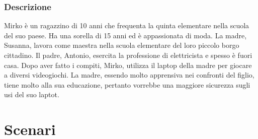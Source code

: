 \documentclass[../Report.tex]{subfiles}
\begin{document}
    \subsubsection{Descrizione}
    Mirko è un ragazzino di 10 anni che frequenta la quinta elementare nella scuola del suo paese. Ha una sorella di 15 anni ed è appassionata di moda. La madre, Susanna, lavora come maestra nella scuola elementare del loro piccolo borgo cittadino. Il padre, Antonio, esercita la professione di elettricista e spesso è fuori casa. Dopo aver fatto i compiti, Mirko, utilizza il laptop della madre per giocare a diversi videogiochi. La madre, essendo molto apprensiva nei confronti del figlio, tiene molto alla sua educazione, pertanto vorrebbe una maggiore sicurezza sugli usi del suo laptot.


    \section{Scenari}
\end{document}
